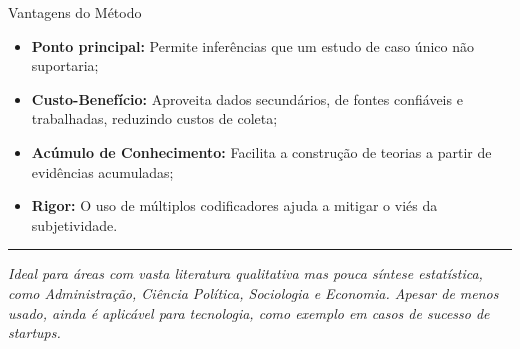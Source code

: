 \begin{frame}{Vantagens do Método}
    \begin{itemize}
        \item \textbf{Ponto principal:} Permite inferências que um estudo de caso único não suportaria;
        \item \textbf{Custo-Benefício:} Aproveita dados secundários, de fontes confiáveis e trabalhadas, reduzindo custos de coleta;
        \item \textbf{Acúmulo de Conhecimento:} Facilita a construção de teorias a partir de evidências acumuladas;
        \item \textbf{Rigor:} O uso de múltiplos codificadores ajuda a mitigar o viés da subjetividade.
    \end{itemize}

    \vspace{1em}
    {\color{steel}\rule{\linewidth}{0.5mm}}
    \centering
    \textit{Ideal para áreas com vasta literatura qualitativa mas pouca síntese estatística, como Administração, Ciência Política, Sociologia e Economia. Apesar de menos usado, ainda é aplicável para tecnologia, como exemplo em casos de sucesso de startups.}
\end{frame}